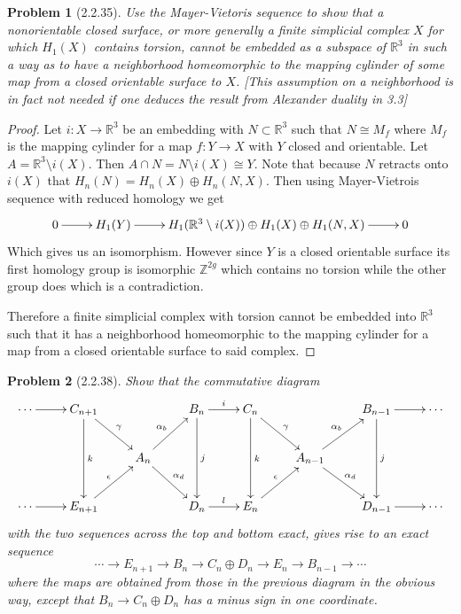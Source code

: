 \documentclass[10pt]{article}
\newcommand{\sk}{\vskip 10mm}
\newcommand{\bb}[1]{\mathbb{#1}}
\theoremstyle{plain}
\newtheorem{problem}{Problem}
\theoremstyle{remark}
\begin{document}
\begin{problem}[2.2.35]
  Use the Mayer-Vietoris sequence to show that a
  nonorientable closed surface, or more generally
  a finite simplicial complex $X$ for which $H_1(X)$
  contains torsion, cannot be embedded as a subspace
  of $\bb{R}^3$ in such a way as to have a neighborhood
  homeomorphic to the mapping cylinder of some map from a
  closed orientable surface to $X$. [This assumption on a
  neighborhood is in fact not needed if one deduces the
  result from Alexander duality in 3.3]
\end{problem}

\begin{proof}
  Let $i:X\rightarrow\bb{R}^3$ be an embedding with $N\subset \bb{R}^3$ such that
  $N\cong M_f$ where $M_f$ is the mapping cylinder for a map $f:Y\rightarrow X$
  with $Y$ closed and orientable. Let $A= \bb{R}^3\setminus i(X)$. Then
  $A\cap N = N\setminus i(X)\cong Y$. Note that because $N$ retracts onto $i(X)$ that
  $H_n(N)=H_n(X)\oplus H_n(N,X)$. Then using Mayer-Vietrois sequence with reduced
  homology we get
  \[
    \xymatrix{
      0\ar[r] & H_1(Y) \ar[r] & H_1(\bb{R}^3\setminus i(X))\oplus H_1(X)\oplus H_1(N,X) \ar[r] & 0
    }
  \]
  Which gives us an isomorphism. However since $Y$ is a closed orientable surface
  its first homology group is isomorphic $\bb{Z}^{2g}$ which contains no torsion while
  the other group does which is a contradiction.

  Therefore a finite simplicial complex with torsion cannot be embedded into $\bb{R}^3$
  such that it has a neighborhood homeomorphic to the mapping cylinder for a map
  from a closed orientable surface to said complex.
\end{proof}

\sk

\begin{problem}[2.2.38]
  Show that the commutative diagram
  \[
    \xymatrix{
      \cdots \ar[r] & C_{n+1} \ar[dd]^k \ar[rd]^\gamma & & B_n \ar[dd]^j \ar[r]^i & C_n \ar[dd]^k \ar[rd]^\gamma & & B_{n-1} \ar[r] \ar[dd]^j&\cdots\\
      && A_n \ar[ru]^{\alpha_b} \ar[rd]^{\alpha_d} & && A_{n-1} \ar[ru]^{\alpha_b} \ar[rd]^{\alpha_d} & \\
      \cdots \ar[r] & E_{n+1} \ar[ru]^\epsilon & & D_n \ar[r]^l & E_n \ar[ru]^\epsilon & & D_{n-1} \ar[r] &\cdots\\
    }
  \]
  with the two sequences across the top and bottom exact,
  gives rise to an exact sequence
  \[
    \cdots\rightarrow E_{n+1}\rightarrow B_n\rightarrow C_n\oplus D_n\rightarrow E_n\rightarrow B_{n-1}\rightarrow\cdots
  \]
  where the maps are obtained from those in the previous
  diagram in the obvious way, except that $B_n\rightarrow C_n\oplus D_n$
  has a minus sign in one coordinate.
\end{problem}
\end{document}
